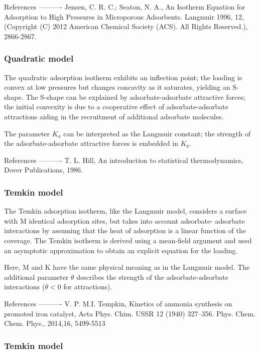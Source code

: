 References
----------
Jensen, C. R. C.; Seaton, N. A., An Isotherm Equation for Adsorption to High
   Pressures in Microporous Adsorbents. Langmuir 1996, 12, (Copyright (C) 2012
   American Chemical Society (ACS). All Rights Reserved.), 2866-2867.

   
\subsubsection{Quadratic model}

The quadratic adsorption isotherm exhibits an inflection point; the loading
is convex at low pressures but changes concavity as it saturates, yielding
an S-shape. The S-shape can be explained by adsorbate-adsorbate attractive
forces; the initial convexity is due to a cooperative
effect of adsorbate-adsorbate attractions aiding in the recruitment of
additional adsorbate molecules.

The parameter \(K_a\) can be interpreted as the Langmuir constant; the
strength of the adsorbate-adsorbate attractive forces is embedded in \(K_b\).

References
----------
T. L. Hill, An introduction to statistical thermodynamics, Dover
   Publications, 1986.

\subsubsection{Temkin model}

The Temkin adsorption isotherm, like the Langmuir model, considers
a surface with M identical adsorption sites, but takes into account adsorbate-
adsorbate interactions by assuming that the heat of adsorption is a linear
function of the coverage. The Temkin isotherm is derived using a
mean-field argument and used an asymptotic approximation
to obtain an explicit equation for the loading.

Here, M and K have the same physical meaning as in the Langmuir model.
The additional parameter \(\theta\) describes the strength of the adsorbate-adsorbate
interactions (\(\theta < 0\) for attractions).

References
----------
V. P. M.I. Tempkin, Kinetics of ammonia synthesis on promoted iron
catalyst, Acta Phys. Chim. USSR 12 (1940) 327–356.
Phys. Chem. Chem. Phys., 2014,16, 5499-5513


\subsubsection{Temkin model}

